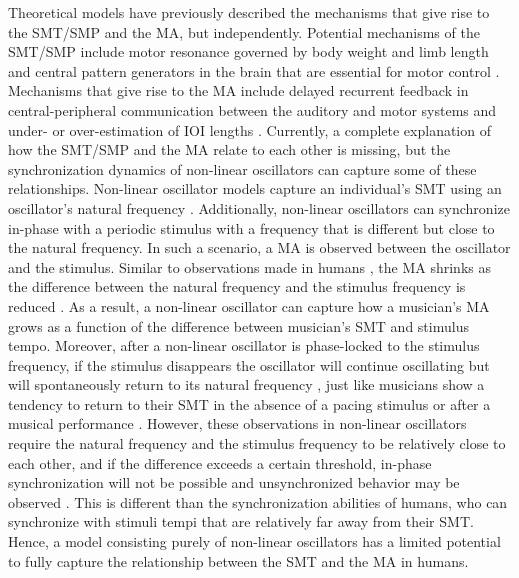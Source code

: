 \documentclass{report}
\begin{document}
Theoretical models have previously described the mechanisms that give rise to the SMT/SMP and the MA, but independently. Potential mechanisms of the SMT/SMP include motor resonance governed by body weight and limb length \cite{goodman2000advantages} and central pattern generators in the brain that are essential for motor control \cite{latash1992virtual, wolpert2007probabilistic}. Mechanisms that give rise to the MA include delayed recurrent feedback in central-peripheral communication between the auditory and motor systems \cite{stepp2010strong, roman2019delayed, aschersleben2002temporal} and under- or over-estimation of IOI lengths \cite{loehr2009subdividing}. Currently, a complete explanation of how the SMT/SMP and the MA relate to each other is missing, but the synchronization dynamics of non-linear oscillators can capture some of these relationships. Non-linear oscillator models capture an individual's SMT using an oscillator's natural frequency \cite{large2002tracking, large2002perceiving, mcauley2006time}. Additionally, non-linear oscillators can synchronize in-phase with a periodic stimulus with a frequency that is different but close to the natural frequency. In such a scenario, a MA is observed between the oscillator and the stimulus. Similar to observations made in humans \cite{scheurich2018tapping}, the MA shrinks as the difference between the natural frequency and the stimulus frequency is reduced \cite{kim2015signal, kim2019mode}. As a result, a non-linear oscillator can capture how a musician's MA grows as a function of the difference between musician's SMT and stimulus tempo. Moreover, after a non-linear oscillator is phase-locked to the stimulus frequency, if the stimulus disappears the oscillator will continue oscillating but will spontaneously return to its natural frequency \cite{kim2015signal, kim2019mode}, just like musicians show a tendency to return to their SMT in the absence of a pacing stimulus \cite{zamm2018musicians} or after a musical performance \cite{zamm2016endogenous}. However, these observations in non-linear oscillators require the natural frequency and the stimulus frequency to be relatively close to each other, and if the difference exceeds a certain threshold, in-phase synchronization will not be possible and unsynchronized behavior may be observed \cite{kim2015signal, kim2019mode}. This is different than the synchronization abilities of humans, who can synchronize with stimuli tempi that are relatively far away from their SMT. Hence, a model consisting purely of non-linear oscillators has a limited potential to fully capture the relationship between the SMT and the MA in humans.
\end{document}
